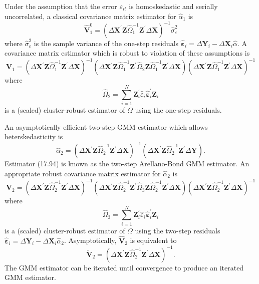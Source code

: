\documentclass[10pt]{article}
\begin{document}
Under the assumption that the error $\varepsilon_{i t}$ is homoskedastic and serially uncorrelated, a classical covariance matrix estimator for $\widehat{\alpha}_{1}$ is
$$
\widehat{\boldsymbol{V}}_{1}^{0}=\left(\Delta \boldsymbol{X}^{\prime} \boldsymbol{Z} \widehat{\Omega}_{1}^{-1} \boldsymbol{Z}^{\prime} \Delta \boldsymbol{X}\right)^{-1} \widehat{\sigma}_{\varepsilon}^{2}
$$
where $\widehat{\sigma}_{\varepsilon}^{2}$ is the sample variance of the one-step residuals $\widehat{\boldsymbol{\varepsilon}}_{i}=\Delta \boldsymbol{Y}_{i}-\Delta \boldsymbol{X}_{i} \widehat{\alpha}$. A covariance matrix estimator which is robust to violation of these assumptions is
$$
\widehat{\boldsymbol{V}}_{1}=\left(\Delta \boldsymbol{X}^{\prime} \boldsymbol{Z} \widehat{\Omega}_{1}^{-1} \boldsymbol{Z}^{\prime} \Delta \boldsymbol{X}\right)^{-1}\left(\Delta \boldsymbol{X}^{\prime} \boldsymbol{Z} \widehat{\Omega}_{1}^{-1} \boldsymbol{Z}^{\prime} \widehat{\Omega}_{2} \boldsymbol{Z} \widehat{\Omega}_{1}^{-1} \boldsymbol{Z}^{\prime} \Delta \boldsymbol{X}\right)\left(\Delta \boldsymbol{X}^{\prime} \boldsymbol{Z} \widehat{\Omega}_{1}^{-1} \boldsymbol{Z}^{\prime} \Delta \boldsymbol{X}\right)^{-1}
$$
where
$$
\widehat{\Omega}_{2}=\sum_{i=1}^{N} \boldsymbol{Z}_{i}^{\prime} \widehat{\varepsilon}_{i} \widehat{\boldsymbol{\varepsilon}}_{i}^{\prime} \boldsymbol{Z}_{i}
$$
is a (scaled) cluster-robust estimator of $\Omega$ using the one-step residuals.

An asymptotically efficient two-step GMM estimator which allows heterskedasticity is
$$
\widehat{\alpha}_{2}=\left(\Delta \boldsymbol{X}^{\prime} \boldsymbol{Z} \widehat{\Omega}_{2}^{-1} \boldsymbol{Z}^{\prime} \Delta \boldsymbol{X}\right)^{-1}\left(\Delta \boldsymbol{X}^{\prime} \boldsymbol{Z} \widehat{\Omega}_{2}^{-1} \boldsymbol{Z}^{\prime} \Delta \boldsymbol{Y}\right) .
$$
Estimator (17.94) is known as the two-step Arellano-Bond GMM estimator. An appropriate robust covariance matrix estimator for $\widehat{\alpha}_{2}$ is
$$
\widehat{\boldsymbol{V}}_{2}=\left(\Delta \boldsymbol{X}^{\prime} \boldsymbol{Z} \widehat{\Omega}_{2}^{-1} \boldsymbol{Z}^{\prime} \Delta \boldsymbol{X}\right)^{-1}\left(\Delta \boldsymbol{X}^{\prime} \boldsymbol{Z} \widehat{\Omega}_{2}^{-1} \boldsymbol{Z}^{\prime} \widehat{\Omega}_{3} \boldsymbol{Z} \widehat{\Omega}_{2}^{-1} \boldsymbol{Z}^{\prime} \Delta \boldsymbol{X}\right)\left(\Delta \boldsymbol{X}^{\prime} \boldsymbol{Z} \widehat{\Omega}_{2}^{-1} \boldsymbol{Z}^{\prime} \Delta \boldsymbol{X}\right)^{-1}
$$
where
$$
\widehat{\Omega}_{3}=\sum_{i=1}^{N} \boldsymbol{Z}_{i}^{\prime} \widehat{\varepsilon}_{i} \widehat{\boldsymbol{\varepsilon}}_{i}^{\prime} \boldsymbol{Z}_{i}
$$
is a (scaled) cluster-robust estimator of $\Omega$ using the two-step residuals $\widehat{\boldsymbol{\varepsilon}}_{i}=\Delta \boldsymbol{Y}_{i}-\Delta \boldsymbol{X}_{i} \widehat{\alpha}_{2}$. Asymptotically, $\widehat{\boldsymbol{V}}_{2}$ is equivalent to
$$
\widetilde{\boldsymbol{V}}_{2}=\left(\Delta \boldsymbol{X}^{\prime} \boldsymbol{Z} \widehat{\Omega}_{2}^{-1} \boldsymbol{Z}^{\prime} \Delta \boldsymbol{X}\right)^{-1} .
$$
The GMM estimator can be iterated until convergence to produce an iterated GMM estimator.
\end{document}
